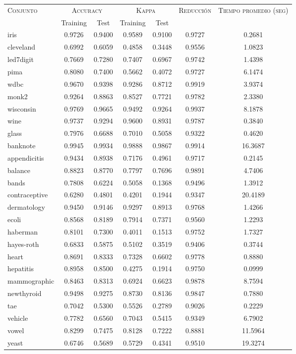 \begin{table}[]
\centering
\begin{tabular}{l c c c c c c}
\hline
\multirow{2}{*}{\textsc{Conjunto}}
	& \multicolumn{2}{c}{\textsc{Accuracy}}
	& \multicolumn{2}{c}{\textsc{Kappa}}
	& \textsc{Reducción}
	& \textsc{Tiempo promedio (seg)} \\
	& Training & Test
	& Training & Test \\ 
\hline
\hline

iris & 0.9726 & 0.9400 & 0.9589 & 0.9100 & 0.9727 & 0.2681 \\
cleveland & 0.6992 & 0.6059 & 0.4858 & 0.3448 & 0.9556 & 1.0823 \\
led7digit & 0.7669 & 0.7280 & 0.7407 & 0.6967 & 0.9742 & 1.4398 \\
pima & 0.8080 & 0.7400 & 0.5662 & 0.4072 & 0.9727 & 6.1474 \\
wdbc & 0.9670 & 0.9398 & 0.9286 & 0.8712 & 0.9919 & 3.9374 \\
monk2 & 0.9264 & 0.8863 & 0.8527 & 0.7721 & 0.9782 & 2.3380 \\
wisconsin & 0.9769 & 0.9665 & 0.9492 & 0.9264 & 0.9937 & 8.1878 \\
wine & 0.9737 & 0.9294 & 0.9600 & 0.8931 & 0.9787 & 0.3840 \\
glass & 0.7976 & 0.6688 & 0.7010 & 0.5058 & 0.9322 & 0.4620 \\
banknote & 0.9945 & 0.9934 & 0.9888 & 0.9867 & 0.9914 & 16.3687 \\
appendicitis & 0.9434 & 0.8938 & 0.7176 & 0.4961 & 0.9717 & 0.2145 \\
balance & 0.8823 & 0.8770 & 0.7797 & 0.7696 & 0.9891 & 4.7406 \\
bands & 0.7808 & 0.6224 & 0.5058 & 0.1368 & 0.9496 & 1.3912 \\
contraceptive & 0.6280 & 0.4801 & 0.4201 & 0.1944 & 0.9347 & 20.4189 \\
dermatology & 0.9450 & 0.9146 & 0.9297 & 0.8913 & 0.9768 & 1.4266 \\
ecoli & 0.8568 & 0.8189 & 0.7914 & 0.7371 & 0.9560 & 1.2293 \\
haberman & 0.8101 & 0.7300 & 0.4011 & 0.1513 & 0.9752 & 1.7327 \\
hayes-roth & 0.6833 & 0.5875 & 0.5102 & 0.3519 & 0.9406 & 0.3744 \\
heart & 0.8691 & 0.8333 & 0.7328 & 0.6602 & 0.9778 & 0.8880 \\
hepatitis & 0.8958 & 0.8500 & 0.4275 & 0.1914 & 0.9750 & 0.0999 \\
mammographic & 0.8463 & 0.8313 & 0.6924 & 0.6623 & 0.9878 & 8.7594 \\
newthyroid & 0.9498 & 0.9275 & 0.8730 & 0.8136 & 0.9847 & 0.7880 \\
tae & 0.7042 & 0.5300 & 0.5526 & 0.2789 & 0.9026 & 0.2229 \\
vehicle & 0.7782 & 0.6560 & 0.7043 & 0.5415 & 0.9349 & 6.7902 \\
vowel & 0.8299 & 0.7475 & 0.8128 & 0.7222 & 0.8881 & 11.5964 \\
yeast & 0.6746 & 0.5689 & 0.5729 & 0.4341 & 0.9510 & 19.3274 \\


\end{tabular}
\end{table}
